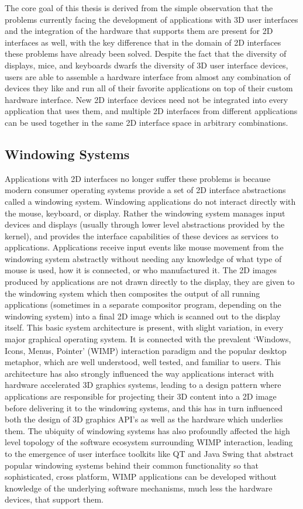 	The core goal of this thesis is derived from the simple observation that the problems currently facing the development of applications with 3D user interfaces and the integration of the hardware that supports them are present for 2D interfaces as well, with the key difference that in the domain of 2D interfaces these problems have already been solved. Despite the fact that the diversity of displays, mice, and keyboards dwarfs the diversity of 3D user interface devices, users are able to assemble a hardware interface from almost any combination of devices they like and run all of their favorite applications on top of their custom hardware interface. New 2D interface devices need not be integrated into every application that uses them, and multiple 2D interfaces from different applications can be used together in the same 2D interface space in arbitrary combinations. 
	
\subsection{Windowing Systems}

	Applications with 2D interfaces no longer suffer these problems is because modern consumer operating systems provide a set of 2D interface abstractions called a windowing system. Windowing applications do not interact directly with the mouse, keyboard, or display. Rather the windowing system manages input devices and displays (usually through lower level abstractions provided by the kernel), and provides the interface capabilities of these devices as services to applications. Applications receive input events like mouse movement from the windowing system abstractly without needing any knowledge of what type of mouse is used, how it is connected, or who manufactured it. The 2D images produced by applications are not drawn directly to the display, they are given to the windowing system which then composites the output of all running applications (sometimes in a separate compositor program, depending on the windowing system) into a final 2D image which is scanned out to the display itself. 
This basic system architecture is present, with slight variation, in every major graphical operating system. It is connected with the prevalent ‘Windows, Icons, Menus, Pointer' (WIMP) interaction paradigm and the popular desktop metaphor, which are well understood, well tested, and familiar to users. This architecture has also strongly influenced the way applications interact with hardware accelerated 3D graphics systems, leading to a design pattern where applications are responsible for projecting their 3D content into a 2D image before delivering it to the windowing systems, and this has in turn influenced both the design of 3D graphics API's as well as the hardware which underlies them. The ubiquity of windowing systems has also profoundly affected the high level topology of the software ecosystem surrounding WIMP interaction, leading to the emergence of user interface toolkits like QT and Java Swing that abstract popular windowing systems behind their common functionality so that sophisticated, cross platform, WIMP applications can be developed without knowledge of the underlying software mechanisms, much less the hardware devices, that support them.
 
